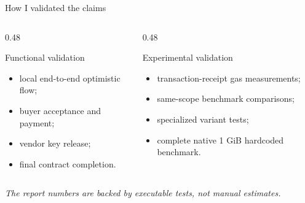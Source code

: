 \documentclass[aspectratio=169,10pt]{beamer}
\newcommand{\giB}{GiB}
\begin{document}
\begin{frame}{How I validated the claims}
  \begin{columns}[T,onlytextwidth]
    \begin{column}{0.48\textwidth}
      \begin{block}{Functional validation}
        \begin{itemize}
          \item local end-to-end optimistic flow;
          \item buyer acceptance and payment;
          \item vendor key release;
          \item final contract completion.
        \end{itemize}
      \end{block}
    \end{column}
    \begin{column}{0.48\textwidth}
      \begin{block}{Experimental validation}
        \begin{itemize}
          \item transaction-receipt gas measurements;
          \item same-scope benchmark comparisons;
          \item specialized variant tests;
          \item complete native 1 \giB{} hardcoded benchmark.
        \end{itemize}
      \end{block}
    \end{column}
  \end{columns}
  \vfill
  \centering
  \textit{The report numbers are backed by executable tests, not manual estimates.}
\end{frame}
\end{document}
